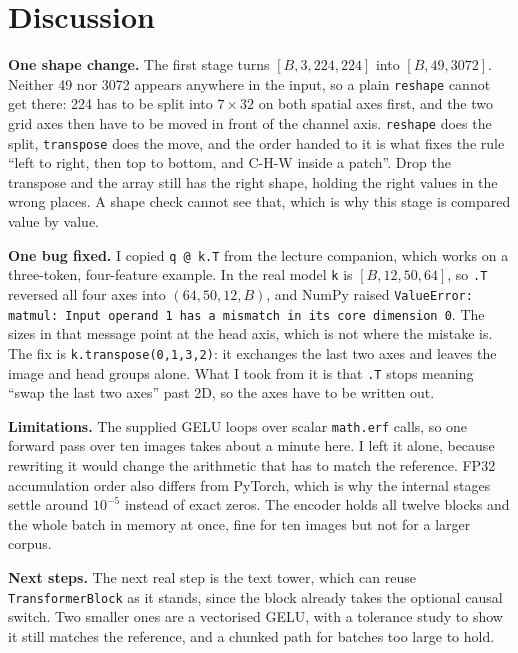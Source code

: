 \documentclass[a4paper,12pt]{article}
\begin{document}
\section{Discussion}

\textbf{One shape change.} The first stage turns $[B,3,224,224]$ into
$[B,49,3072]$. Neither 49 nor 3072 appears anywhere in the input, so a plain
\texttt{reshape} cannot get there: 224 has to be split into $7\times32$ on both
spatial axes first, and the two grid axes then have to be moved in front of the
channel axis. \texttt{reshape} does the split, \texttt{transpose} does the move,
and the order handed to it is what fixes the rule ``left to right, then top to
bottom, and C-H-W inside a patch''. Drop the transpose and the array still has
the right shape, holding the right values in the wrong places. A shape check
cannot see that, which is why this stage is compared value by value.

\textbf{One bug fixed.} I copied \texttt{q @ k.T} from the lecture companion,
which works on a three-token, four-feature example. In the real model \texttt{k}
is $[B,12,50,64]$, so \texttt{.T} reversed all four axes into
$(64,50,12,B)$, and NumPy raised
\texttt{ValueError: matmul: Input operand 1 has a mismatch in its core
dimension 0}. The sizes in that message point at the head axis, which is not
where the mistake is. The fix is \texttt{k.transpose(0,1,3,2)}: it exchanges the
last two axes and leaves the image and head groups alone. What I took from it is
that \texttt{.T} stops meaning ``swap the last two axes'' past 2D, so the axes
have to be written out.

\textbf{Limitations.} The supplied GELU loops over scalar \texttt{math.erf}
calls, so one forward pass over ten images takes about a minute here. I left it alone,
because rewriting it would change the arithmetic that has to match the
reference. FP32 accumulation order also differs from PyTorch, which is why the
internal stages settle around $10^{-5}$ instead of exact zeros. The encoder
holds all twelve blocks and the whole batch in memory at once, fine for ten
images but not for a larger corpus.

\textbf{Next steps.} The next real step is the text tower, which can reuse
\texttt{TransformerBlock} as it stands, since the block already takes the
optional causal switch. Two smaller ones are a vectorised GELU, with a tolerance
study to show it still matches the reference, and a chunked path for batches too
large to hold.
\end{document}
